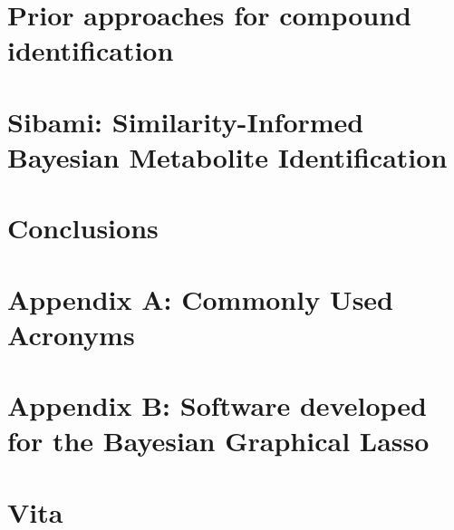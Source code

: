 \documentclass[final]{ulthesis}
\begin{document}
\chapter{Prior approaches for compound identification}


\chapter{Sibami: Similarity-Informed Bayesian Metabolite Identification}


\chapter{Conclusions} 



\backmatter





%
%





\chapter{Appendix A: Commonly Used Acronyms}


\chapter{Appendix B: Software developed for the Bayesian Graphical Lasso}


\chapter{Vita}

\end{document}
